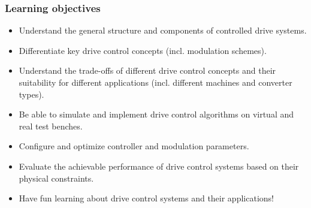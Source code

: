 \begin{frame}
    \frametitle{Learning objectives}
    \begin{itemize}
        \item Understand the general structure and components of controlled drive systems.
        \item<2-> Differentiate key drive control concepts (incl. modulation schemes).
        \item<3-> Understand the trade-offs of different drive control concepts and their suitability for different applications (incl. different machines and converter types).
        \item<4-> Be able to simulate and implement drive control algorithms on virtual and real test benches.
        \item<5-> Configure and optimize controller and modulation parameters.
        \item<6-> Evaluate the achievable performance of drive control systems based on their physical constraints.
        \item<7-> Have fun learning about drive control systems and their applications!
    \end{itemize}
\end{frame}


